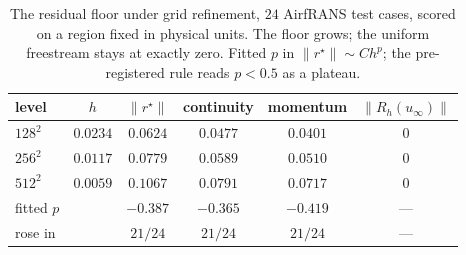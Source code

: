 \begin{table}[t]
\centering
\caption{The residual floor under grid refinement, $24$ AirfRANS test cases, scored on
a region fixed in physical units. The floor grows; the uniform freestream stays at
exactly zero. Fitted $p$ in $\|r^\star\|\sim Ch^{p}$; the pre-registered rule reads
$p<0.5$ as a plateau.}
\label{tab:floor_ladder}
\begin{tabular}{lccccc}
\toprule
level & $h$ & $\|r^\star\|$ & continuity & momentum & $\|R_h(u_\infty)\|$ \\
\midrule
$128^2$ & $0.0234$ & $0.0624$ & $0.0477$ & $0.0401$ & $0$ \\
$256^2$ & $0.0117$ & $0.0779$ & $0.0589$ & $0.0510$ & $0$ \\
$512^2$ & $0.0059$ & $\mathbf{0.1067}$ & $0.0791$ & $0.0717$ & $0$ \\
\midrule
fitted $p$ & & $-0.387$ & $-0.365$ & $-0.419$ & --- \\
rose in & & $21/24$ & $21/24$ & $21/24$ & --- \\
\bottomrule
\end{tabular}
\end{table}

